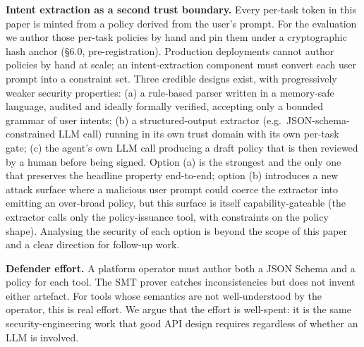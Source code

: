 \textbf{Intent extraction as a second trust boundary.} Every per-task
token in this paper is minted from a policy derived from the user's
prompt. For the evaluation we author those per-task policies by hand and
pin them under a cryptographic hash anchor (§6.0, pre-registration).
Production deployments cannot author policies by hand at scale; an
intent-extraction component must convert each user prompt into a
constraint set. Three credible designs exist, with progressively weaker
security properties: (a) a rule-based parser written in a memory-safe
language, audited and ideally formally verified, accepting only a
bounded grammar of user intents; (b) a structured-output extractor
(e.g.~JSON-schema-constrained LLM call) running in its own trust domain
with its own per-task gate; (c) the agent's own LLM call producing a
draft policy that is then reviewed by a human before being signed.
Option (a) is the strongest and the only one that preserves the headline
property end-to-end; option (b) introduces a new attack surface where a
malicious user prompt could coerce the extractor into emitting an
over-broad policy, but this surface is itself capability-gateable (the
extractor calls only the policy-issuance tool, with constraints on the
policy shape). Analysing the security of each option is beyond the scope
of this paper and a clear direction for follow-up work.

\textbf{Defender effort.} A platform operator must author both a JSON
Schema and a policy for each tool. The SMT prover catches
inconsistencies but does not invent either artefact. For tools whose
semantics are not well-understood by the operator, this is real effort.
We argue that the effort is well-spent: it is the same
security-engineering work that good API design requires regardless of
whether an LLM is involved.

